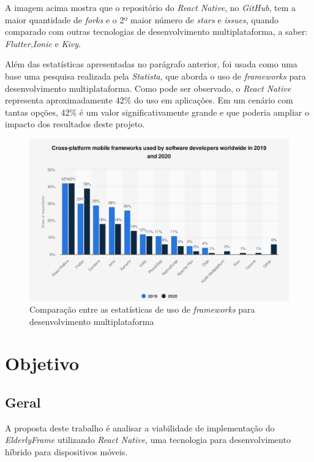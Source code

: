 \documentclass[
	12pt,				    %
	openright,			    %
	oneside,			    %
	a4paper,			    %
    sumario=tradicional,    %
	english,			    %
	brazil,				    %
	]{abntex2}              %
\begin{document}
A imagem acima mostra que o repositório do \textit{React Native}, no \textit{GitHub}, tem a maior quantidade de \textit{forks} e o 2º maior número de \textit{stars} e \textit{issues}, quando comparado com outras tecnologias de desenvolvimento multiplataforma, a saber: \textit{Flutter},\textit{Ionic} e \textit{Kivy}.

Além das estatísticas apresentadas no parágrafo anterior, foi usada como uma base uma pesquisa realizada pela \textit{Statista}, que aborda o uso de \textit{frameworks} para desenvolvimento multiplataforma. Como pode ser observado, o \textit{React Native} representa aproximadamente 42\% do uso em aplicações. Em um cenário com tantas opções, 42\% é um valor significativamente grande e que poderia ampliar o impacto dos resultados deste projeto.

\begin{figure}[H]
	\begin{center}
		\includegraphics[height=.5\linewidth]{mobile-frameworks-statista.png}
	\end{center}
	\caption[GitHub Compare]{Comparação entre as estatísticas de uso de \textit{frameworks} para desenvolvimento multiplataforma}
	\label{fig:statistaResearch}
\end{figure}

\chapter{Objetivo}\label{sec:objetivos}

\section{Geral}

A proposta deste trabalho é analisar a viabilidade de implementação do \emph{ElderlyFrame} utilizando \emph{React Native}, uma tecnologia para desenvolvimento híbrido para dispositivos móveis.
\end{document}
